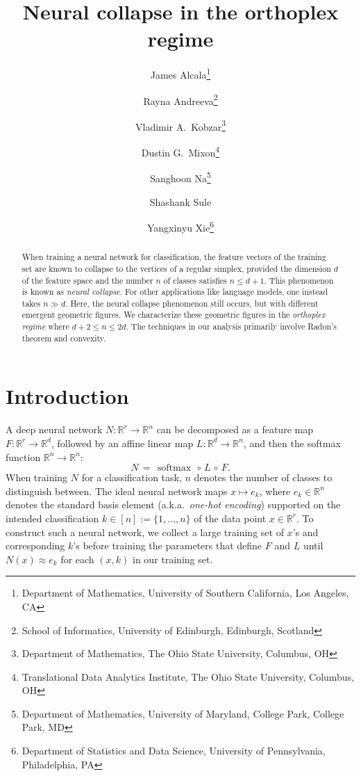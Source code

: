 \documentclass{article}
\title{Neural collapse in the orthoplex regime}
\author{
James Alcala\thanks{Department of Mathematics, University of Southern California, Los Angeles, CA}
\and 
Rayna Andreeva\thanks{School of Informatics, University of Edinburgh, Edinburgh, Scotland}
\and 
Vladimir A.\ Kobzar\thanks{Department of Mathematics, The Ohio State University, Columbus, OH}
\and 
Dustin G.\ Mixon\footnotemark[3] \thanks{Translational Data Analytics Institute, The Ohio State University, Columbus, OH}
\and 
Sanghoon Na\thanks{Department of Mathematics, University of Maryland, College Park, College Park, MD}
\and 
Shashank Sule\footnotemark[5]
\and 
Yangxinyu Xie\thanks{Department of Statistics and Data Science, University of Pennsylvania, Philadelphia, PA}
}
\date{}
\theoremstyle{plain}
\theoremstyle{definition}
\begin{document}
\maketitle

\begin{abstract}
When training a neural network for classification, the feature vectors of the training set are known to collapse to the vertices of a regular simplex, provided the dimension $d$ of the feature space and the number $n$ of classes satisfies $n\leq d+1$.
This phenomenon is known as \textit{neural collapse}.
For other applications like language models, one instead takes $n\gg d$.
Here, the neural collapse phenomenon still occurs, but with different emergent geometric figures.
We characterize these geometric figures in the \textit{orthoplex regime} where $d+2\leq n\leq 2d$.
The techniques in our analysis primarily involve Radon's theorem and convexity.
\end{abstract}

\section{Introduction}

A deep neural network $N\colon\mathbb{R}^r\to\mathbb{R}^n$ can be decomposed as a feature map $F\colon\mathbb{R}^r\to\mathbb{R}^d$, followed by an affine linear map $L\colon\mathbb{R}^d\to\mathbb{R}^n$, and then the softmax function $\mathbb{R}^n\to\mathbb{R}^n$:
\[
N
\, = \,
\operatorname{softmax} \, \circ \, L \, \circ \, F.
\]
When training $N$ for a classification task, $n$ denotes the number of classes to distinguish between.
The ideal neural network maps $x\mapsto e_k$, where $e_k\in\mathbb{R}^n$ denotes the standard basis element (a.k.a.\ \textit{one-hot encoding}) supported on the intended classification $k\in[n]:=\{1,\ldots,n\}$ of the data point $x\in\mathbb{R}^r$.
To construct such a neural network, we collect a large training set of $x$'s and corresponding $k$'s before training the parameters that define $F$ and $L$ until $N(x)\approx e_k$ for each $(x,k)$ in our training set.
\end{document}
